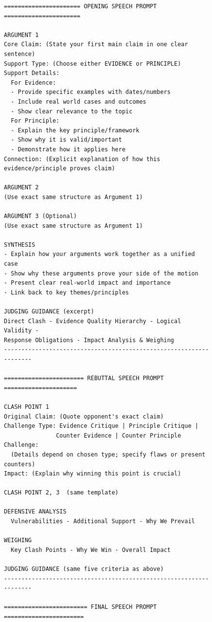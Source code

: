 \documentclass{article}
\begin{document}
\begin{figure}[htbp]
  \centering
  \lstset{style=promptstyle}

  \begin{adjustbox}{max height=0.88\textheight}
  \begin{lstlisting}[language={}]
====================== OPENING SPEECH PROMPT ======================

ARGUMENT 1
Core Claim: (State your first main claim in one clear sentence)
Support Type: (Choose either EVIDENCE or PRINCIPLE)
Support Details:
  For Evidence:
  - Provide specific examples with dates/numbers
  - Include real world cases and outcomes
  - Show clear relevance to the topic
  For Principle:
  - Explain the key principle/framework
  - Show why it is valid/important
  - Demonstrate how it applies here
Connection: (Explicit explanation of how this evidence/principle proves claim)

ARGUMENT 2
(Use exact same structure as Argument 1)

ARGUMENT 3 (Optional)
(Use exact same structure as Argument 1)

SYNTHESIS
- Explain how your arguments work together as a unified case
- Show why these arguments prove your side of the motion
- Present clear real-world impact and importance
- Link back to key themes/principles

JUDGING GUIDANCE (excerpt)
Direct Clash - Evidence Quality Hierarchy - Logical Validity -
Response Obligations - Impact Analysis & Weighing
-------------------------------------------------------------------

======================= REBUTTAL SPEECH PROMPT =====================

CLASH POINT 1
Original Claim: (Quote opponent's exact claim)
Challenge Type: Evidence Critique | Principle Critique |
               Counter Evidence | Counter Principle
Challenge:
  (Details depend on chosen type; specify flaws or present counters)
Impact: (Explain why winning this point is crucial)

CLASH POINT 2, 3  (same template)

DEFENSIVE ANALYSIS
  Vulnerabilities - Additional Support - Why We Prevail

WEIGHING
  Key Clash Points - Why We Win - Overall Impact

JUDGING GUIDANCE (same five criteria as above)
-------------------------------------------------------------------

======================== FINAL SPEECH PROMPT =======================


\end{lstlisting}
\end{adjustbox}
\end{figure}
\end{document}
